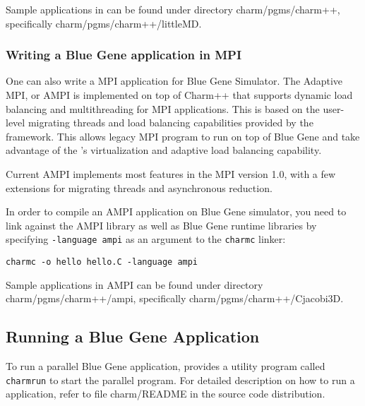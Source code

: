 Sample applications in \charmpp{} can be found under directory
charm/pgms/charm++, specifically charm/pgms/charm++/littleMD.

\subsubsection{Writing a Blue Gene application in MPI}

One can also write a MPI application for Blue Gene Simulator.
The Adaptive MPI, or AMPI is implemented on top of Charm++ that supports
dynamic load balancing and multithreading for MPI applications. This is based
on the user-level migrating threads and load balancing capabilities provided
by the \charmpp{} framework. This allows legacy MPI program to run 
on top of Blue Gene \charmpp{} and take advantage of the \charmpp{}'s
virtualization and adaptive load balancing capability.

Current AMPI implements most features in the MPI version 1.0, with a few
extensions for migrating threads and asynchronous reduction.

In order to compile an AMPI application on Blue Gene simulator, you need 
to link against the AMPI library as well as Blue Gene \charmpp{} runtime
libraries by specifying \texttt{-language ampi} as an argument to 
the {\tt charmc} linker:
\begin{verbatim}
charmc -o hello hello.C -language ampi
\end{verbatim}

Sample applications in AMPI can be found under directory
charm/pgms/charm++/ampi, specifically charm/pgms/charm++/Cjacobi3D.

\subsection{Running a Blue Gene Application}

To run a parallel Blue Gene application, \charmpp{} provides a utility program
called {\tt charmrun} to start the parallel program. 
For detailed description on how to run a \charmpp{} application, 
refer to file charm/README in the source code distribution.

